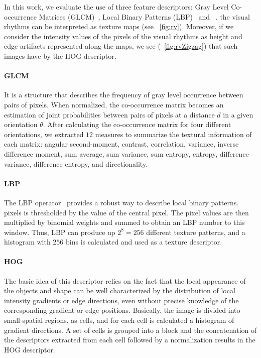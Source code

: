 \documentclass[journal]{IEEEtran}
\providecommand{\rv}[1]{{\protect\color{black}{#1}}}
\providecommand{\rrv}[1]{{\protect\color{black}{#1}}}
\providecommand{\bmark}[1]{{\protect\color{black}{#1}}}
\begin{document}
In this work, we evaluate the use of three feature descriptors: Gray Level Co-occurrence Matrices (GLCM)~\cite{Haralick:TSMC:1973}, Local Binary Patterns (LBP)~\cite{Ojala:TPAMI:2002} and \rv{Histogram of Oriented Gradients (HOG)}~\cite{Dalal:CVPR:2005}. \bmark{The choice for using GLCM and LBP descriptors is motivated by the fact that} the visual rhythms can be interpreted as texture maps (see \rrv{Fig.}~\ref{fig:rv}). Moreover, if we consider the intensity values of the pixels of the visual rhythms as height and edge artifacts represented along the maps, we see (\rrv{Fig.}~\ref{fig:rvZigzag}) that such images have \bmark{different edge forms, a property that can be reasonably explored} by the HOG descriptor.

\paragraph{GLCM}
It is a structure that describes the frequency of gray level occurrence between pairs of pixels. When normalized, the co-occurrence matrix becomes an estimation of joint probabilities between pairs of pixels at a distance $d$ in a given orientation $\theta$. After calculating the co-occurrence matrix for four different orientations, we extracted $12$ measures to summarize the textural information of each matrix: angular second-moment, contrast, correlation, variance, inverse difference moment, sum average, sum variance, sum entropy, entropy, difference variance, difference entropy, and directionality.

\paragraph{LBP}
{The LBP operator~\cite{Ojala:TPAMI:2002} provides a robust way to describe local binary patterns. \bmark{Basically, a window of size $3$} pixels is thresholded by the value of the central pixel. The pixel values are then multiplied by binomial weights and summed to obtain an LBP number to this window. Thus, LBP can produce up $2^{8} = 256$  different texture patterns, and a histogram with $256$ bins is calculated and used as a texture descriptor.}

\paragraph{HOG}
The basic idea of this descriptor relies on the fact that the local appearance of the objects and shape can be well characterized by the distribution of local intensity gradients or edge directions, even without precise knowledge of the corresponding gradient or edge positions. Basically, the image is divided into small spatial regions, \rv{referred to} as cells, and for each cell is calculated a histogram of gradient directions. A set of cells is grouped into a block and the concatenation of the descriptors extracted from each cell followed by a normalization results in the HOG descriptor.
\end{document}
